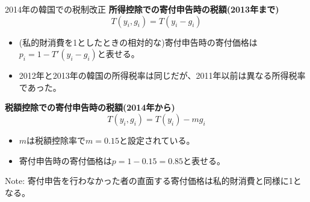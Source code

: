 \documentclass[dvipdfmx,10pt]{beamer}
\begin{document}
	\begin{frame}{2014年の韓国での税制改正}
		\textbf{所得控除での寄付申告時の税額(2013年まで)}
		\[T(y_{i}, g_{i}) = T(y_{i} - g_{i})\]
		
		\begin{itemize}
			\item (私的財消費を1としたときの相対的な)寄付申告時の寄付価格は$p_i=1 - T'(y_{i} - g_{i})$と表せる。
			\item 2012年と2013年の韓国の所得税率は同じだが、2011年以前は異なる所得税率であった。
		\end{itemize}
		
		\textbf{税額控除での寄付申告時の税額(2014年から)}
		\[T(y_{i}, g_{i}) = T(y_{i}) - m g_{i}\]
		
		\begin{itemize}
			\item \(m\)は税額控除率で\(m = 0.15\)と設定されている。
			\item 寄付申告時の寄付価格は$p=1 - 0.15 = 0.85$と表せる。
		\end{itemize}
		
		Note: 寄付申告を行わなかった者の直面する寄付価格は私的財消費と同様に1となる。
	\end{frame}
\end{document}
